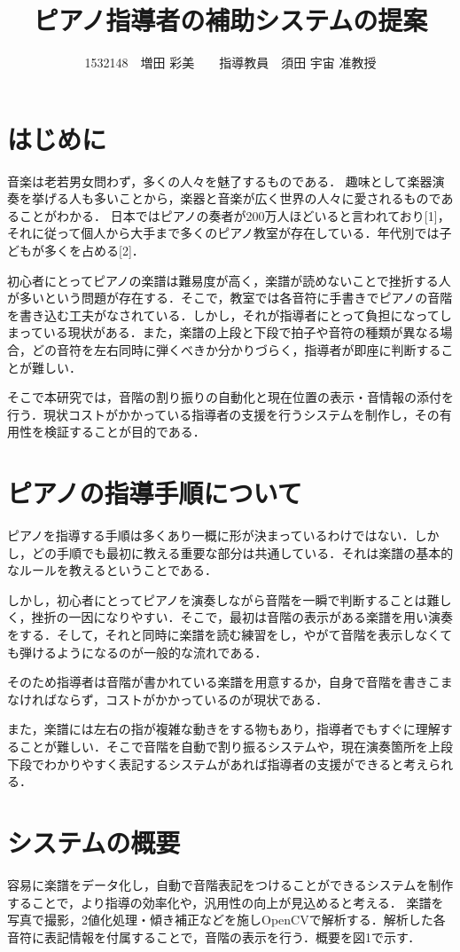 \documentclass[twocolumn,10pt,a4j]{jsarticle}
\title{ピアノ指導者の補助システムの提案}
\author{1532148　増田 彩美　　指導教員　須田 宇宙 准教授}
\date{}
\begin{document}
\maketitle

\section{はじめに}

音楽は老若男女問わず，多くの人々を魅了するものである．
趣味として楽器演奏を挙げる人も多いことから，楽器と音楽が広く世界の人々に愛されるものであることがわかる．
日本ではピアノの奏者が200万人ほどいると言われており[1]，それに従って個人から大手まで多くのピアノ教室が存在している．年代別では子どもが多くを占める[2]．

初心者にとってピアノの楽譜は難易度が高く，楽譜が読めないことで挫折する人が多いという問題が存在する．そこで，教室では各音符に手書きでピアノの音階を書き込む工夫がなされている．しかし，それが指導者にとって負担になってしまっている現状がある．また，楽譜の上段と下段で拍子や音符の種類が異なる場合，どの音符を左右同時に弾くべきか分かりづらく，指導者が即座に判断することが難しい．

そこで本研究では，音階の割り振りの自動化と現在位置の表示・音情報の添付を行う．現状コストがかかっている指導者の支援を行うシステムを制作し，その有用性を検証することが目的である．


\section{ピアノの指導手順について}
ピアノを指導する手順は多くあり一概に形が決まっているわけではない．しかし，どの手順でも最初に教える重要な部分は共通している．それは楽譜の基本的なルールを教えるということである．

しかし，初心者にとってピアノを演奏しながら音階を一瞬で判断することは難しく，挫折の一因になりやすい．そこで，最初は音階の表示がある楽譜を用い演奏をする．そして，それと同時に楽譜を読む練習をし，やがて音階を表示しなくても弾けるようになるのが一般的な流れである．

そのため指導者は音階が書かれている楽譜を用意するか，自身で音階を書きこまなければならず，コストがかかっているのが現状である．

また，楽譜には左右の指が複雑な動きをする物もあり，指導者でもすぐに理解することが難しい．そこで音階を自動で割り振るシステムや，現在演奏箇所を上段下段でわかりやすく表記するシステムがあれば指導者の支援ができると考えられる．

\section{システムの概要}
容易に楽譜をデータ化し，自動で音階表記をつけることができるシステムを制作することで，より指導の効率化や，汎用性の向上が見込めると考える．
楽譜を写真で撮影，2値化処理・傾き補正などを施しOpenCVで解析する．解析した各音符に表記情報を付属することで，音階の表示を行う．概要を図1で示す．
\end{document}
